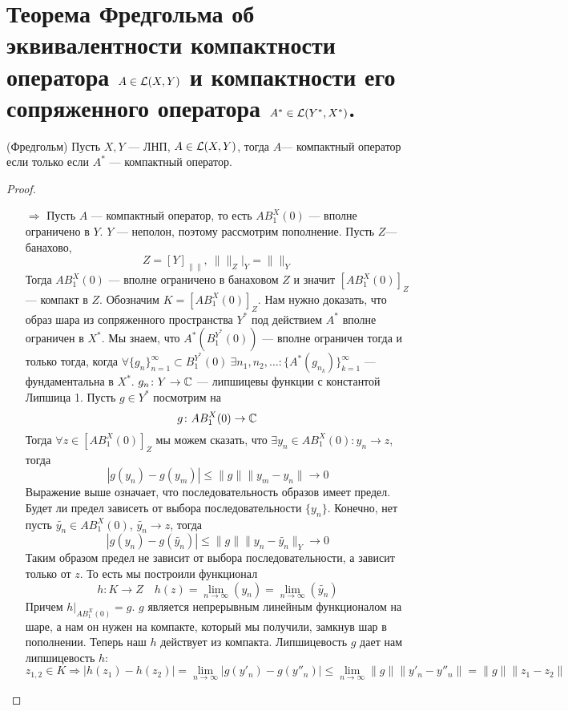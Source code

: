 \newpage
\section{Теорема Фредгольма об эквивалентности компактности оператора $A \in \mathcal{L}(X,Y)$ и компактности его сопряженного оператора $A^* \in \mathcal{L}(Y^*,X^*)$.}

\begin{theorem}(Фредгольм)\label{th:fr2}
	Пусть $X,Y$ --- ЛНП, $A \in \mathcal{L}(X, Y)$, тогда $ A $--- компактный оператор если только если $A^*$ --- компактный оператор. 
\end{theorem}
\begin{proof}
	\hfill
	\begin{enumerate}
		\item[$\Rightarrow$] Пусть $A$ --- компактный оператор, то есть $AB_1^X(0)$ --- вполне ограничено в $Y$. $Y$ --- неполон, поэтому рассмотрим пополнение. Пусть $Z$--- банахово, $$Z = [Y]_{\|\|}, \ \|\|_Z\big |_{Y} = \|\|_Y$$
		Тогда $AB_1^X(0)$ --- вполне ограничено в банаховом $Z$ и значит $[AB_1^X(0)]_Z$ --- компакт в $Z$. Обозначим $K =[AB_1^X(0)]_Z$. Нам нужно доказать, что образ шара из сопряженного пространства $Y^*$ под действием $A^*$ вполне ограничен в $X^*$. Мы знаем, что
		$
		A^*(B_1^{Y^*}(0))$ --- вполне ограничен тогда и только тогда, когда $\forall \{g_n\}_{n=1}^\infty \subset B_1^{Y^*}(0) \ \exists n_1, n_2, \dots\colon \{A^*(g_{n_k})\}_{k=1}^\infty$ --- фундаментальна в $X^*$. $g_n\colon Y \to \mathbb{C}$ --- липшицевы функции с константой Липшица 1. Пусть $g \in Y^*$ посмотрим на 
		$$
		g \colon AB_1^X(0) \to \mathbb{C}
		$$
		Тогда $\forall z \in [AB_1^X(0)]_Z$ мы можем сказать, что $\exists y_n \in AB_1^X(0)\colon y_n \to z$, тогда
		$$
		|g(y_n) - g(y_m)| \leq \|g\| \|y_m - y_n\| \to 0
		$$
		Выражение выше означает, что последовательность образов имеет предел. Будет ли предел зависеть от выбора последовательности $\{y_n\}$. Конечно, нет пусть $\tilde{y_n} \in AB_1^X(0)$, $\tilde{y_n} \to z$, тогда
		$$
		|g(y_n) - g(\tilde{y_n})| \leq \|g\| \|y_n - \tilde{y_n}\|_Y \to 0 
		$$
		Таким образом предел не зависит от выбора последовательности, а зависит только от $z$. То есть мы построили функционал 
		$$
		h\colon K \to Z \quad h (z) = \lim\limits_{n \to \infty}(y_n) = \lim\limits_{n \to \infty}(\tilde{y_n})
		$$
		Причем $\displaystyle h \big |_{AB_1^X(0)} = g$. $g$ является непрерывным линейным функционалом на шаре, а нам он нужен на компакте, который мы получили, замкнув шар в пополнении. Теперь наш $h$ действует из компакта. Липшицевость $g$ дает нам липшицевость $h$:
		$$
		z_{1,2} \in K \Rightarrow |h(z_1)- h(z_2)| = \lim\limits_{n \to \infty}|g(y'_n) - g(y''_n)| \leq \lim\limits_{n \to \infty} \|g\| \|y'_n - y''_n\| = \|g\|\|z_1-z_2\|
$$
\end{enumerate}
\end{proof}
